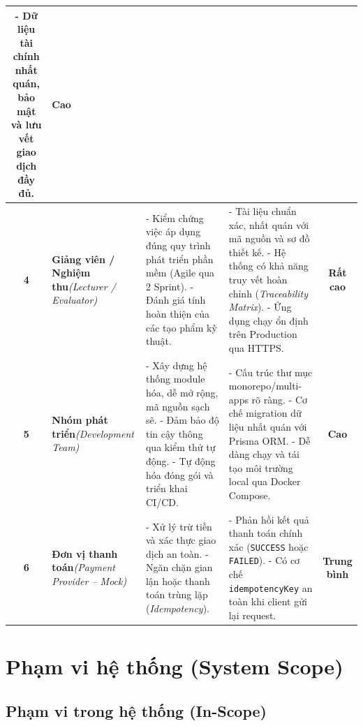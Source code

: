 \documentclass[12pt,a4paper]{article}
\begin{document}
\begin{table}[H]
\begin{tabularx}{\textwidth}{|c|>{\raggedright\arraybackslash}p{2.8cm}|>{\raggedright\arraybackslash}X|>{\raggedright\arraybackslash}X|c|}
- Dữ liệu tài chính nhất quán, bảo mật và lưu vết giao dịch đầy đủ. & 
\textbf{Cao} \\
\hline
\textbf{4} & \textbf{Giảng viên / Nghiệm thu}\newline\textit{(Lecturer / Evaluator)} & 
- Kiểm chứng việc áp dụng đúng quy trình phát triển phần mềm (Agile qua 2 Sprint).\newline
- Đánh giá tính hoàn thiện của các tạo phẩm kỹ thuật. & 
- Tài liệu chuẩn xác, nhất quán với mã nguồn và sơ đồ thiết kế.\newline
- Hệ thống có khả năng truy vết hoàn chỉnh (\textit{Traceability Matrix}).\newline
- Ứng dụng chạy ổn định trên Production qua HTTPS. & 
\textbf{Rất cao} \\
\hline
\textbf{5} & \textbf{Nhóm phát triển}\newline\textit{(Development Team)} & 
- Xây dựng hệ thống module hóa, dễ mở rộng, mã nguồn sạch sẽ.\newline
- Đảm bảo độ tin cậy thông qua kiểm thử tự động.\newline
- Tự động hóa đóng gói và triển khai CI/CD. & 
- Cấu trúc thư mục monorepo/multi-apps rõ ràng.\newline
- Cơ chế migration dữ liệu nhất quán với Prisma ORM.\newline
- Dễ dàng chạy và tái tạo môi trường local qua Docker Compose. & 
\textbf{Cao} \\
\hline
\textbf{6} & \textbf{Đơn vị thanh toán}\newline\textit{(Payment Provider -- Mock)} & 
- Xử lý trừ tiền và xác thực giao dịch an toàn.\newline
- Ngăn chặn gian lận hoặc thanh toán trùng lặp (\textit{Idempotency}). & 
- Phản hồi kết quả thanh toán chính xác (\texttt{SUCCESS} hoặc \texttt{FAILED}).\newline
- Có cơ chế \texttt{idempotencyKey} an toàn khi client gửi lại request. & 
\textbf{Trung bình} \\
\hline
\end{tabularx}
\end{table}

\newpage

\section{Phạm vi hệ thống (System Scope)}

\subsection{Phạm vi trong hệ thống (In-Scope)}
\end{document}
